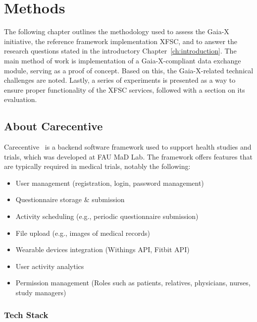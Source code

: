 \chapter{Methods}\label{ch:methods}

\begin{chapterabstract}
    The following chapter outlines the methodology used to assess the Gaia-X initiative, the reference framework implementation XFSC, and to answer the research questions stated in the introductory Chapter~\ref{ch:introduction}.
    The main method of work is implementation of a Gaia-X-compliant data exchange module, serving as a proof of concept.
    Based on this, the Gaia-X-related technical challenges are noted.
    Lastly, a series of experiments is presented as a way to ensure proper functionality of the XFSC services, followed with a section on its evaluation.
\end{chapterabstract}

\section{About Carecentive}\label{sec:about-carecentive}

Carecentive~\cite{carecentive} is a backend software framework used to support health studies and trials, which was developed at FAU MaD Lab.
The framework offers features that are typically required in medical trials, notably the following:
\begin{itemize}
    \item User management (registration, login, password management)
    \item Questionnaire storage \& submission
    \item Activity scheduling (e.g., periodic questionnaire submission)
    \item File upload (e.g., images of medical records)
    \item Wearable devices integration (Withings API, Fitbit API)
    \item User activity analytics
    \item Permission management (Roles such as patients, relatives, physicians, nurses, study managers)
\end{itemize}

\subsection{Tech Stack}\label{subsec:tech-stack}

